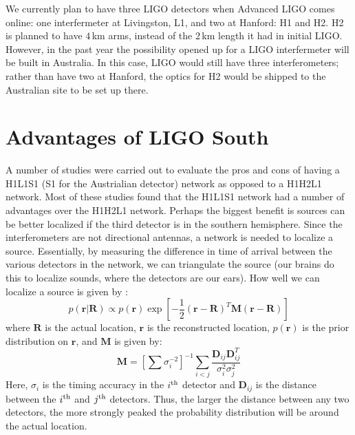 
We currently plan to have three \ac{LIGO} detectors when Advanced LIGO comes online: one interfermeter at Livingston, L1, and two at Hanford: H1 and H2. H2 is planned to have $4\,$km arms, instead of the $2\,$km length it had in initial LIGO. However, in the past year the possibility opened up for a \ac{LIGO} interfermeter will be built in Australia. In this case, LIGO would still have three interferometers; rather than have two at Hanford, the optics for H2 would be shipped to the Australian site to be set up there.

\section{Advantages of LIGO South}

A number of studies were carried out to evaluate the pros and cons of having a H1L1S1 (S1 for the Austrialian detector) network as opposed to a H1H2L1 network. Most of these studies found that the H1L1S1 network had a number of advantages over the H1H2L1 network. Perhaps the biggest benefit is sources can be better localized if the third detector is in the southern hemisphere. Since the interferometers are not directional antennas, a network is needed to localize a source. Essentially, by measuring the difference in time of arrival between the various detectors in the network, we can triangulate the source (our brains do this to localize sounds, where the detectors are our ears). How well we can localize a source is given by \cite{ref:steve_triangulation_wiki, ref:localization_wiki}:
\begin{equation*}
p(\mathbf{r}|\mathbf{R}) \propto p(\mathbf{r})\exp\left[ -\frac{1}{2}(\mathbf{r} - \mathbf{R})^T \mathbf{M}(\mathbf{r}-\mathbf{R})\right]
\end{equation*}
where $\mathbf{R}$ is the actual location, $\mathbf{r}$ is the reconstructed location, $p(\mathbf{r})$ is the prior distribution on $\mathbf{r}$, and $\mathbf{M}$ is given by:
\begin{equation*}
\mathbf{M} = \left[\sum \sigma_i^{-2}\right]^{-1} \sum_{i<j} \frac{\mathbf{D}_{ij}\mathbf{D}^T_{ij}}{\sigma^2_i \sigma^2_j}
\end{equation*}
Here, $\sigma_i$ is the timing accuracy in the $i^{\mathrm{th}}$ detector and $\mathbf{D}_{ij}$ is the distance between the $i^{\mathrm{th}}$ and $j^{\mathrm{th}}$ detectors. Thus, the larger the distance between any two detectors, the more strongly peaked the probability distribution will be around the actual location.

